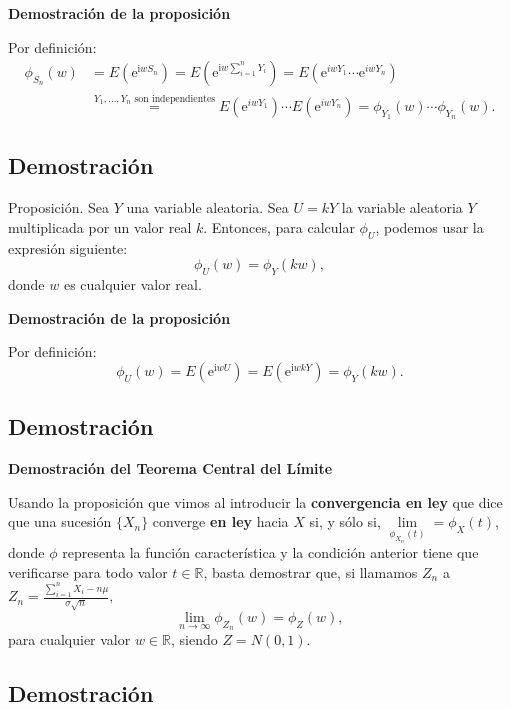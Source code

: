 \documentclass[]{book}
\begin{document}
\textbf{Demostración de la proposición}

Por definición:
\[
\begin{array}{rl}
\phi_{S_n}(w) & =E\left(\mathrm{e}^{\mathrm{i} w S_n}\right)=E\left(\mathrm{e}^{\mathrm{i} w \sum\limits_{i=1}^n Y_i}\right) = E\left(\mathrm{e}^{i w Y_1}\cdots \mathrm{e}^{i w Y_n}\right)\\ & \stackrel{\mbox{$Y_1,\ldots,Y_n$ son independientes}}{=} E\left(\mathrm{e}^{i w Y_1}\right)\cdots E\left(\mathrm{e}^{i w Y_n}\right) =\phi_{Y_1}(w)\cdots \phi_{Y_n}(w).
\end{array}
\]

\hypertarget{demostraciuxf3n-5}{%
\subsection{Demostración}\label{demostraciuxf3n-5}}

 Proposición.
Sea \(Y\) una variable aleatoria. Sea \(U=kY\) la variable aleatoria \(Y\) multiplicada por un valor real \(k\). Entonces, para calcular \(\phi_{U}\), podemos usar la expresión siguiente:
\[
\phi_{U}(w)=\phi_Y(kw),
\]
donde \(w\) es cualquier valor real.

\textbf{Demostración de la proposición}

Por definición:
\[
\phi_{U}(w)=E\left(\mathrm{e}^{\mathrm{i} w U}\right) = E\left(\mathrm{e}^{\mathrm{i} w k Y}\right)=\phi_Y(kw).
\]

\hypertarget{demostraciuxf3n-6}{%
\subsection{Demostración}\label{demostraciuxf3n-6}}

\textbf{Demostración del Teorema Central del Límite}

Usando la proposición que vimos al introducir la \textbf{convergencia en ley} que dice que una sucesión \(\{X_n\}\) converge \textbf{en ley} hacia \(X\) si, y sólo si, \(\lim\limits_{\phi_{X_n}(t)}=\phi_{X}(t)\), donde \(\phi\) representa la función característica y la condición anterior tiene que verificarse para todo valor \(t\in\mathbb{R}\), basta demostrar que, si llamamos \(Z_n\) a
\(Z_n = \frac{\sum\limits_{i=1}^n X_i-n\mu}{\sigma\sqrt{n}},\)
\[
\lim_{n\to \infty}\phi_{Z_n}(w)=\phi_Z(w),
\]
para cualquier valor \(w\in\mathbb{R}\), siendo \(Z=N(0,1)\).

\hypertarget{demostraciuxf3n-7}{%
\subsection{Demostración}\label{demostraciuxf3n-7}}
\end{document}

